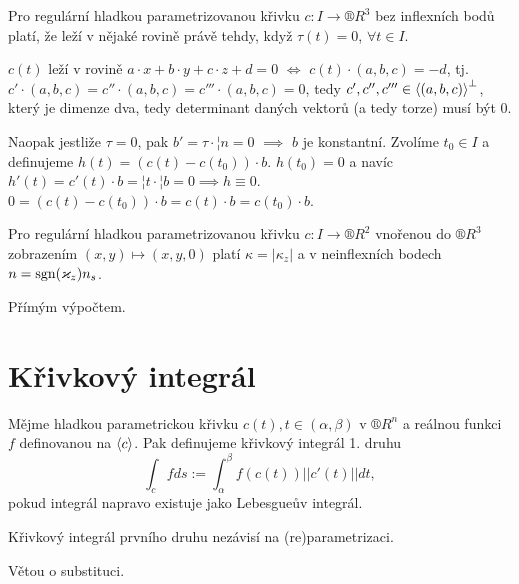 \documentclass[12pt]{article}					%
\begin{document}
	\begin{veta}
		Pro regulární hladkou parametrizovanou křivku $c: I \rightarrow ®R^3$ bez inflexních bodů platí, že leží v nějaké rovině právě tehdy, když $\tau(t) = 0$, $\forall t \in I$.

		\begin{dukazin}
			$c(t)$ leží v rovině $a·x + b·y + c·z + d = 0$ $\Leftrightarrow$ $c(t)·(a, b, c) = -d$, tj. $c'·(a, b, c) = c''·(a, b, c) = c'''·(a, b, c) = 0$, tedy $c', c'', c''' \in \left\langle(a, b, c)\right\rangle^\perp$, který je dimenze dva, tedy determinant daných vektorů (a tedy torze) musí být 0.

			Naopak jestliže $\tau = 0$, pak $b' = \tau·¦n = 0$ $\implies$ $b$ je konstantní. Zvolíme $t_0 \in I$ a definujeme $h(t) = (c(t) - c(t_0))·b$. $h(t_0) = 0$ a navíc $h'(t) = c'(t)·b = ¦t·¦b = 0 \implies h ≡ 0$. $0 = (c(t) - c(t_0))·b = c(t)·b = c(t_0)·b$.
		\end{dukazin}
	\end{veta}

	\begin{veta}
		Pro regulární hladkou parametrizovanou křivku $c: I \rightarrow ®R^2$ vnořenou do $®R^3$ zobrazením $(x, y) \mapsto (x, y, 0)$ platí $\kappa = |\kappa_z|$ a v neinflexních bodech $n = \operatorname{sgn}(\varkappa_z)n_s$.

		\begin{dukazin}
			Přímým výpočtem.
		\end{dukazin}
	\end{veta}

\section{Křivkový integrál}
\begin{definice}
	Mějme hladkou parametrickou křivku $c(t), t \in (\alpha, \beta)$ v $®R^n$ a reálnou funkci $f$ definovanou na $\left\langle c\right\rangle$. Pak definujeme křivkový integrál 1. druhu
	$$ \int_c f ds := \int_\alpha^\beta f(c(t))||c'(t)||dt, $$
	pokud integrál napravo existuje jako Lebesgueův integrál.
\end{definice}

\begin{veta}
	Křivkový integrál prvního druhu nezávisí na (re)parametrizaci.

	\begin{dukazin}
		Větou o substituci.
	\end{dukazin}
\end{veta}
\end{document}
